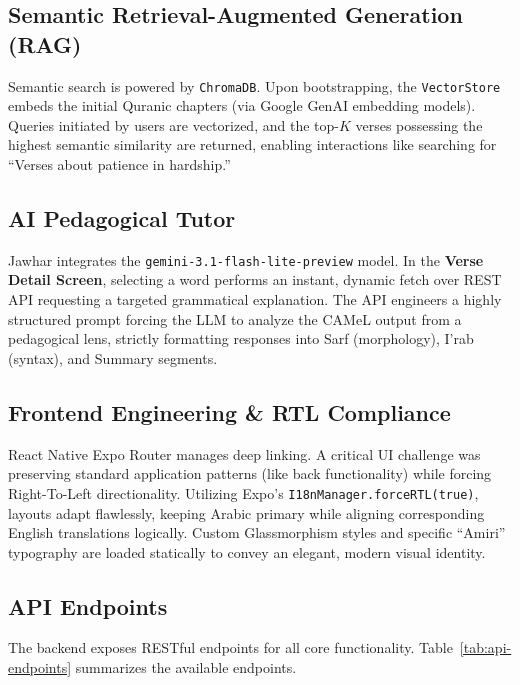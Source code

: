 \documentclass[11pt, a4paper]{article}
\begin{document}
\subsection{Semantic Retrieval-Augmented Generation (RAG)}
Semantic search is powered by \texttt{ChromaDB}. Upon bootstrapping, the \texttt{VectorStore} embeds the initial Quranic chapters (via Google GenAI embedding models). Queries initiated by users are vectorized, and the top-$K$ verses possessing the highest semantic similarity are returned, enabling interactions like searching for ``Verses about patience in hardship.''

\subsection{AI Pedagogical Tutor}
Jawhar integrates the \texttt{gemini-3.1-flash-lite-preview} model. In the \textbf{Verse Detail Screen}, selecting a word performs an instant, dynamic fetch over REST API requesting a targeted grammatical explanation. The API engineers a highly structured prompt forcing the LLM to analyze the CAMeL output from a pedagogical lens, strictly formatting responses into Sarf (morphology), I'rab (syntax), and Summary segments.

\subsection{Frontend Engineering \& RTL Compliance}
React Native Expo Router manages deep linking. A critical UI challenge was preserving standard application patterns (like back functionality) while forcing Right-To-Left directionality. Utilizing Expo's \texttt{I18nManager.forceRTL(true)}, layouts adapt flawlessly, keeping Arabic primary while aligning corresponding English translations logically. Custom Glassmorphism styles and specific ``Amiri'' typography are loaded statically to convey an elegant, modern visual identity.

\subsection{API Endpoints}
The backend exposes RESTful endpoints for all core functionality. Table~\ref{tab:api-endpoints} summarizes the available endpoints.
\end{document}

